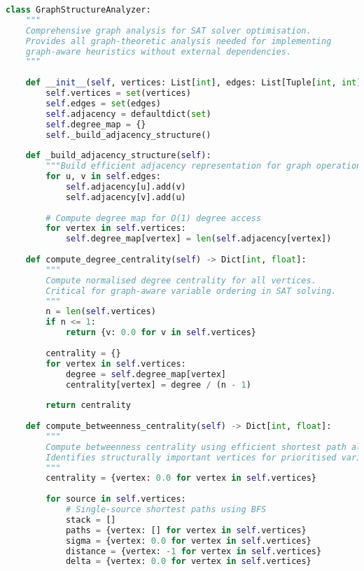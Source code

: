 \begin{lstlisting}[language=Python, caption=Complete Graph Structure Analyzer Implementation]
class GraphStructureAnalyzer:
    """
    Comprehensive graph analysis for SAT solver optimisation.
    Provides all graph-theoretic analysis needed for implementing
    graph-aware heuristics without external dependencies.
    """
    
    def __init__(self, vertices: List[int], edges: List[Tuple[int, int]]):
        self.vertices = set(vertices)
        self.edges = set(edges)
        self.adjacency = defaultdict(set)
        self.degree_map = {}
        self._build_adjacency_structure()
    
    def _build_adjacency_structure(self):
        """Build efficient adjacency representation for graph operations"""
        for u, v in self.edges:
            self.adjacency[u].add(v)
            self.adjacency[v].add(u)
        
        # Compute degree map for O(1) degree access
        for vertex in self.vertices:
            self.degree_map[vertex] = len(self.adjacency[vertex])
    
    def compute_degree_centrality(self) -> Dict[int, float]:
        """
        Compute normalised degree centrality for all vertices.
        Critical for graph-aware variable ordering in SAT solving.
        """
        n = len(self.vertices)
        if n <= 1:
            return {v: 0.0 for v in self.vertices}
        
        centrality = {}
        for vertex in self.vertices:
            degree = self.degree_map[vertex]
            centrality[vertex] = degree / (n - 1)
        
        return centrality
    
    def compute_betweenness_centrality(self) -> Dict[int, float]:
        """
        Compute betweenness centrality using efficient shortest path algorithms.
        Identifies structurally important vertices for prioritised variable ordering.
        """
        centrality = {vertex: 0.0 for vertex in self.vertices}
        
        for source in self.vertices:
            # Single-source shortest paths using BFS
            stack = []
            paths = {vertex: [] for vertex in self.vertices}
            sigma = {vertex: 0.0 for vertex in self.vertices}
            distance = {vertex: -1 for vertex in self.vertices}
            delta = {vertex: 0.0 for vertex in self.vertices}
            

\end{lstlisting}
